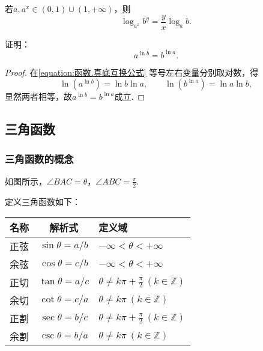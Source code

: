 \begin{corollary}
若\(a,a^x \in (0,1)\cup(1,+\infty)\)，则\[
\log_{a^x} b^y = \frac{y}{x} \log_a b.
\]
\end{corollary}

\begin{example}
证明：\begin{equation}\label{equation:函数.真底互换公式}
a^{\ln b} = b^{\ln a}.
\end{equation}
\begin{proof}
在\cref{equation:函数.真底互换公式} 等号左右变量分别取对数，得\[
\ln(a^{\ln b}) = \ln b \ln a, \qquad
\ln(b^{\ln a}) = \ln a \ln b,
\]显然两者相等，故\(a^{\ln b} = b^{\ln a}\)成立.
\end{proof}
\end{example}

\subsection{三角函数}
\subsubsection{三角函数的概念}
\begin{definition}
如图所示，\(\angle{BAC} = \theta\)，\(\angle{ABC} = \frac{\pi}{2}\).
\begin{center}
\end{center}

定义三角函数如下：
\begin{center}
\def\arraystretch{1.5}
\begin{tabular}{|c|c|l|}
\hline
名称 & 解析式 & 定义域 \\ \hline
正弦 & \(\sin \theta = a/b\) & \(-\infty < \theta < +\infty\) \\ \hline
余弦 & \(\cos \theta = c/b\) & \(-\infty < \theta < +\infty\) \\ \hline
正切 & \(\tan \theta = a/c\) & \(\theta\neq k\pi+\frac{\pi}{2}\ (k\in\mathbb{Z})\) \\ \hline
余切 & \(\cot \theta = c/a\) & \(\theta\neq k\pi\ (k\in\mathbb{Z})\) \\ \hline
正割 & \(\sec \theta = b/c\) & \(\theta\neq k\pi+\frac{\pi}{2}\ (k\in\mathbb{Z})\) \\ \hline
余割 & \(\csc \theta = b/a\) & \(\theta\neq k\pi\ (k\in\mathbb{Z})\) \\ \hline
\end{tabular}
\end{center}
\end{definition}

